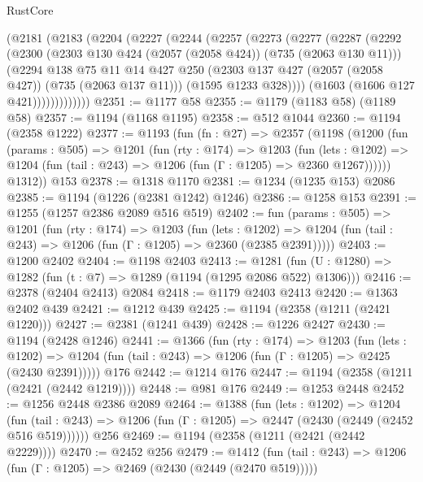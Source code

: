 \begin{lexlean}{RustCore}
\begin{coremodule}
        (@2181
          (@2183
            (@2204
              (@2227
                (@2244
                  (@2257
                    (@2273
                      (@2277
                        (@2287
                          (@2292
                            (@2300
                              (@2303 @130 @424 (@2057 (@2058 @424)) (@735 (@2063 @130 @11)))
                              (@2294
                                @138
                                @75
                                @11
                                @14
                                @427
                                @250
                                (@2303 @137 @427 (@2057 (@2058 @427)) (@735 (@2063 @137 @11)))
                                (@1595 @1233 @328))))
                          (@1603 (@1606 @127 @421)))))))))))))
@2351 := @1177 @58
@2355 := @1179 (@1183 @58) (@1189 @58)
@2357 := @1194 (@1168 @1195)
@2358 := @512 @1044
@2360 := @1194 (@2358 @1222)
@2377 := @1193
    (fun (fn : @27) =>
    @2357
      (@1198
        (@1200
          (fun (params : @505) =>
          @1201
            (fun (rty : @174) =>
            @1203
              (fun (lets : @1202) =>
              @1204 (fun (tail : @243) => @1206 (fun (Γ : @1205) => @2360 @1267))))))
        @1312))
    @153
@2378 := @1318 @1170
@2381 := @1234 (@1235 @153) @2086
@2385 := @1194 (@1226 (@2381 @1242) @1246)
@2386 := @1258 @153
@2391 := @1255 (@1257 @2386 @2089 @516 @519)
@2402 := fun (params : @505) =>
  @1201
    (fun (rty : @174) =>
    @1203
      (fun (lets : @1202) =>
      @1204 (fun (tail : @243) => @1206 (fun (Γ : @1205) => @2360 (@2385 @2391)))))
@2403 := @1200 @2402
@2404 := @1198 @2403
@2413 := @1281 (fun (U : @1280) => @1282 (fun (t : @7) => @1289 (@1194 (@1295 @2086 @522) @1306)))
@2416 := @2378 (@2404 @2413) @2084
@2418 := @1179 @2403 @2413
@2420 := @1363 @2402 @439
@2421 := @1212 @439
@2425 := @1194 (@2358 (@1211 (@2421 @1220)))
@2427 := @2381 (@1241 @439)
@2428 := @1226 @2427
@2430 := @1194 (@2428 @1246)
@2441 := @1366
    (fun (rty : @174) =>
    @1203
      (fun (lets : @1202) =>
      @1204 (fun (tail : @243) => @1206 (fun (Γ : @1205) => @2425 (@2430 @2391)))))
    @176
@2442 := @1214 @176
@2447 := @1194 (@2358 (@1211 (@2421 (@2442 @1219))))
@2448 := @981 @176
@2449 := @1253 @2448
@2452 := @1256 @2448 @2386 @2089
@2464 := @1388
    (fun (lets : @1202) =>
    @1204 (fun (tail : @243) => @1206 (fun (Γ : @1205) => @2447 (@2430 (@2449 (@2452 @516 @519))))))
    @256
@2469 := @1194 (@2358 (@1211 (@2421 (@2442 @2229))))
@2470 := @2452 @256
@2479 := @1412
    (fun (tail : @243) => @1206 (fun (Γ : @1205) => @2469 (@2430 (@2449 (@2470 @519)))))

\end{coremodule}
\end{lexlean}
